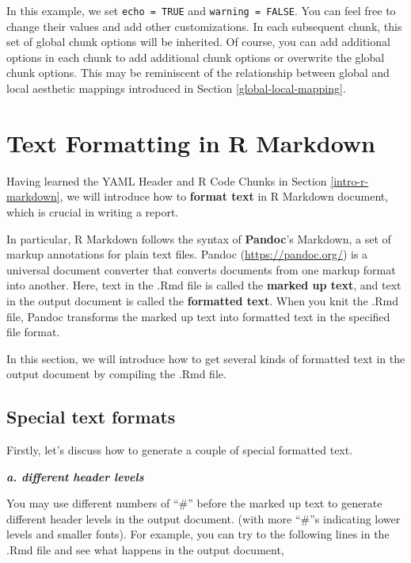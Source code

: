 \documentclass[
]{book}
\begin{document}
In this example, we set \texttt{echo\ =\ TRUE} and \texttt{warning\ =\ FALSE}. You can feel free to change their values and add other customizations. In each subsequent chunk, this set of global chunk options will be inherited. Of course, you can add additional options in each chunk to add additional chunk options or overwrite the global chunk options. This may be reminiscent of the relationship between global and local aesthetic mappings introduced in Section \ref{global-local-mapping}.

\hypertarget{rmd-text-formating}{%
\section{Text Formatting in R Markdown}\label{rmd-text-formating}}

Having learned the YAML Header and R Code Chunks in Section \ref{intro-r-markdown}, we will introduce how to \textbf{format text} in R Markdown document, which is crucial in writing a report.

In particular, R Markdown follows the syntax of \textbf{Pandoc}'s Markdown, a set of markup annotations for plain text files. Pandoc (\url{https://pandoc.org/}) is a universal document converter that converts documents from one markup format into another. Here, text in the .Rmd file is called the \textbf{marked up text}, and text in the output document is called the \textbf{formatted text}. When you knit the .Rmd file, Pandoc transforms the marked up text into formatted text in the specified file format.

In this section, we will introduce how to get several kinds of formatted text in the output document by compiling the .Rmd file.

\hypertarget{special-text-formats}{%
\subsection{Special text formats}\label{special-text-formats}}

Firstly, let's discuss how to generate a couple of special formatted text.

\textbf{\emph{a. different header levels}}

You may use different numbers of ``\#'' before the marked up text to generate different header levels in the output document. (with more ``\#''s indicating lower levels and smaller fonts). For example, you can try to the following lines in the .Rmd file and see what happens in the output document,
\end{document}
